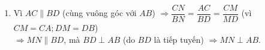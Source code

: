 \begin{vd}
{\begin{enumerate}
			$DM=DA$ (tính chất hai tiếp tuyến cắt nhau)\\
			$OM^2=CA\cdot DB = R^2$.\\
			Ta có $AC+BD\geq 2\sqrt{AC\cdot BD} = 2R$.\\
			$\Rightarrow S_{ABCD}=\dfrac{(AC+BD)\cdot AB}{2}\geq \dfrac{2R\cdot 2R}{2} = 2R^2$.\\
			Vậy $S_{ABCD}$ nhỏ nhất bằng $2R^2 \Leftrightarrow AC = BD$ hay $M$ là điểm chính giữa cung $AB$.
			\item Vì $AC\parallel BD$ (cùng vuông góc với $AB$)
			$\Rightarrow \dfrac{CN}{BN}=\dfrac{AC}{BD}=\dfrac{CM}{MD}$ (vì $CM = CA; DM = DB$)\\
			$\Rightarrow MN\parallel BD$, mà $BD\perp AB$ (do $BD$ là tiếp tuyến) $\Rightarrow MN\perp AB.$
		\end{enumerate}
	}
\end{vd}







